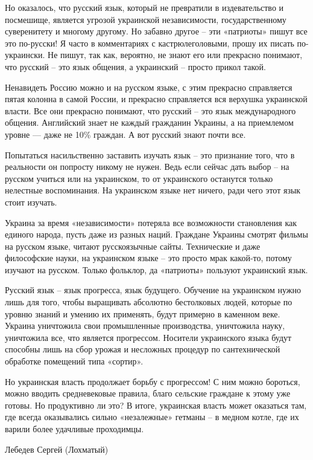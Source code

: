 Но оказалось, что русский язык, который не превратили в издевательство и
посмешище, является угрозой украинской независимости, государственному
суверенитету и многому другому. Но забавно другое – эти «патриоты» пишут все
это по-русски! Я часто в комментариях с кастрюлеголовыми, прошу их писать
по-украински. Не пишут, так как, вероятно, не знают его или прекрасно понимают,
что русский – это язык общения, а украинский – просто прикол такой.

Ненавидеть Россию можно и на русском языке, с этим прекрасно справляется пятая
колонна в самой России, и прекрасно справляется вся верхушка украинской власти.
Все они прекрасно понимают, что русский – это язык международного общения.
Английский знает не каждый гражданин Украины, а на приемлемом уровне — даже не
10\% граждан. А вот русский знают почти все.

Попытаться насильственно заставить изучать язык – это признание того, что в
реальности он попросту никому не нужен. Ведь если сейчас дать выбор – на
русском учиться или на украинском, то от украинского останутся только нелестные
воспоминания. На украинском языке нет ничего, ради чего этот язык стоит
изучать.

Украина за время «независимости» потеряла все возможности становления как
единого народа, пусть даже из разных наций. Граждане Украины смотрят фильмы на
русском языке, читают русскоязычные сайты. Технические и даже философские
науки, на украинском языке – это просто мрак какой-то, потому изучают на
русском. Только фольклор, да «патриоты» пользуют украинский язык.

Русский язык – язык прогресса, язык будущего. Обучение на украинском нужно лишь
для того, чтобы выращивать абсолютно бестолковых людей, которые по уровню
знаний и умению их применять, будут примерно в каменном веке. Украина
уничтожила свои промышленные производства, уничтожила науку, уничтожила все,
что является прогрессом. Носители украинского языка будут способны лишь на сбор
урожая и несложных процедур по сантехнической обработке помещений типа
«сортир».

Но украинская власть продолжает борьбу с прогрессом! С ним можно бороться,
можно вводить средневековые правила, благо сельские граждане к этому уже
готовы. Но продуктивно ли это? В итоге, украинская власть может оказаться там,
где всегда оказывались сильно «незалежные» гетманы – в медном котле, где их
варили более удачливые проходимцы.

Лебедев Сергей (Лохматый) 
  

